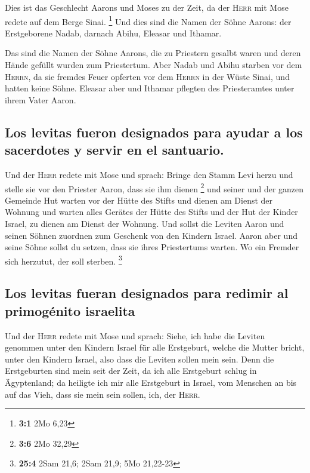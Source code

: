  Dies ist das Geschlecht Aarons und Moses zu der Zeit, da
der \textsc{Herr} mit Mose redete auf dem Berge Sinai. \footnote{\textbf{3:1}
  2Mo 6,23}  Und dies sind die Namen der Söhne Aarons: der
Erstgeborene Nadab, darnach Abihu, Eleasar und Ithamar.

 Das sind die Namen der Söhne Aarons, die zu Priestern
gesalbt waren und deren Hände gefüllt wurden zum Priestertum.
 Aber Nadab und Abihu starben vor dem \textsc{Herrn}, da
sie fremdes Feuer opferten vor dem \textsc{Herrn} in der Wüste Sinai,
und hatten keine Söhne. Eleasar aber und Ithamar pflegten des
Priesteramtes unter ihrem Vater Aaron.

\hypertarget{los-levitas-fueron-designados-para-ayudar-a-los-sacerdotes-y-servir-en-el-santuario.}{%
\subsection{Los levitas fueron designados para ayudar a los sacerdotes y
servir en el
santuario.}\label{los-levitas-fueron-designados-para-ayudar-a-los-sacerdotes-y-servir-en-el-santuario.}}

 Und der \textsc{Herr} redete mit Mose und sprach:
 Bringe den Stamm Levi herzu und stelle sie vor den
Priester Aaron, dass sie ihm dienen \footnote{\textbf{3:6} 2Mo 32,29}
 und seiner und der ganzen Gemeinde Hut warten vor der
Hütte des Stifts und dienen am Dienst der Wohnung  und
warten alles Gerätes der Hütte des Stifts und der Hut der Kinder Israel,
zu dienen am Dienst der Wohnung.  Und sollst die Leviten
Aaron und seinen Söhnen zuordnen zum Geschenk von den Kindern Israel.
 Aaron aber und seine Söhne sollst du setzen, dass sie
ihres Priestertums warten. Wo ein Fremder sich herzutut, der soll
sterben. \footnote{\textbf{25:4} 2Sam 21,6; 2Sam 21,9; 5Mo 21,22-23}

\hypertarget{los-levitas-fueran-designados-para-redimir-al-primoguxe9nito-israelita}{%
\subsection{Los levitas fueran designados para redimir al primogénito
israelita}\label{los-levitas-fueran-designados-para-redimir-al-primoguxe9nito-israelita}}

 Und der \textsc{Herr} redete mit Mose und sprach:
 Siehe, ich habe die Leviten genommen unter den Kindern
Israel für alle Erstgeburt, welche die Mutter bricht, unter den Kindern
Israel, also dass die Leviten sollen mein sein.  Denn die
Erstgeburten sind mein seit der Zeit, da ich alle Erstgeburt schlug in
Ägyptenland; da heiligte ich mir alle Erstgeburt in Israel, vom Menschen
an bis auf das Vieh, dass sie mein sein sollen, ich, der \textsc{Herr}.


